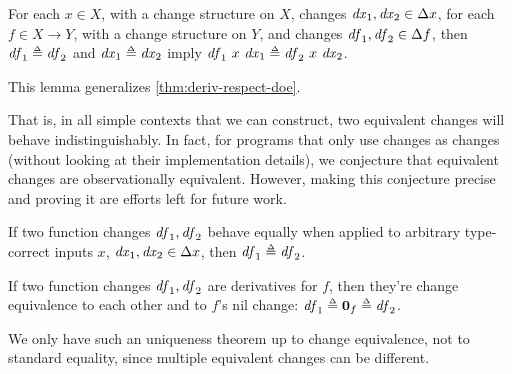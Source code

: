 


\begin{lemma}
  For each $x \in X$, with a change structure on $X$, changes
  $\D{x}_1, \D{x}_2 \in \Change{x}$, for each $f \in X \to Y$,
with a change structure on $Y$, and changes
$\D{f}_1, \D{f}_2 \in \Change{f}$, then $\D{f}_1 \Doe \D{f}_2$ and
$\D{x}_1 \Doe \D{x}_2$ imply
$\D{f}_1~x~\D{x}_1 \Doe \D{f}_2~x~\D{x}_2$.
\end{lemma}
This lemma generalizes \cref{thm:deriv-respect-doe}.

That is, in all simple contexts that we can construct, two equivalent
changes will behave indistinguishably. In fact, for programs that
only use changes as changes (without looking at their
implementation details), we conjecture that equivalent changes are
observationally equivalent. However, making this conjecture
precise and proving it are efforts left for future work.

\begin{lemma}
  If two function changes $\mathit{df}_1, \mathit{df}_2$ behave equally when
  applied to arbitrary type-correct inputs $x$,
  $\D{x}_1, \D{x}_2 \in \Change{x}$, then $\D{f}_1 \Doe \D{f}_2$.
\end{lemma}

\begin{lemma}
  If two function changes $\mathit{df}_1, \mathit{df}_2$ are derivatives for
  $f$, then they're change equivalence to each other and to $f$'s nil change:
  $\D{f}_1 \Doe \NilC{f} \Doe \D{f}_2$.
\end{lemma}
We only have such an uniqueness theorem up to change equivalence, not to
standard equality, since multiple equivalent changes can be
different.
